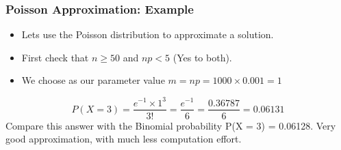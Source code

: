 \begin{frame}
\frametitle{Poisson Approximation: Example}
\begin{itemize}
\item Lets use the Poisson distribution to approximate a solution.
\item First check that $n \geq 50$ and $np < 5$ (Yes to both).
\item We choose as our parameter value $m = np = 1000 \times 0.001 = 1$
\end{itemize}
\[P(X = 3) = \frac{e^{-1} \times 1^3}{3!} = \frac{e^{-1}}{6} = \frac{0.36787}{6} = 0.06131 \]
Compare this answer with the Binomial probability
P(X = 3) = 0.06128.
Very good approximation, with much less computation effort.
\end{frame}


